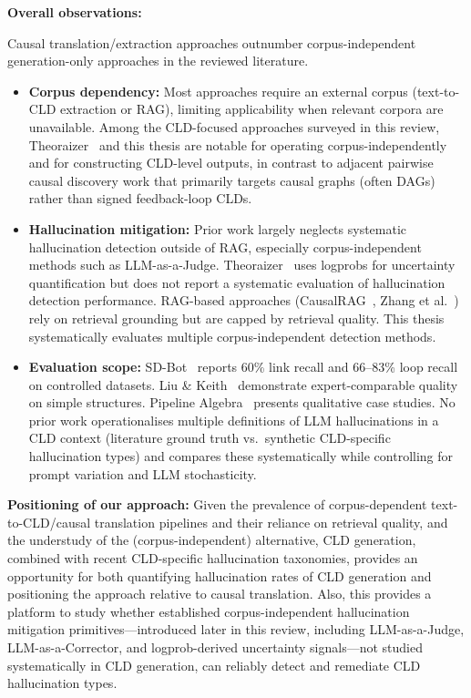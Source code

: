 \noindent\textbf{Overall observations:}

\noindent Causal translation/extraction approaches outnumber corpus-independent generation-only approaches in the reviewed literature.

\begin{itemize}[noitemsep]
    \item \textbf{Corpus dependency:} Most approaches require an external corpus (text-to-CLD extraction or RAG), limiting applicability when relevant corpora are unavailable. Among the CLD-focused approaches surveyed in this review, Theoraizer~\citep{Waaijers2024theoraizer} and this thesis are notable for operating corpus-independently and for constructing CLD-level outputs, in contrast to adjacent pairwise causal discovery work that primarily targets causal graphs (often DAGs) rather than signed feedback-loop CLDs.
    \item \textbf{Hallucination mitigation:} Prior work largely neglects systematic hallucination detection outside of RAG, especially corpus-independent methods such as LLM-as-a-Judge. Theoraizer~\citep{Waaijers2024theoraizer} uses logprobs for uncertainty quantification but does not report a systematic evaluation of hallucination detection performance. RAG-based approaches (CausalRAG~\citep{wang2025causalrag}, Zhang et al.~\citep{zhang2024causal}) rely on retrieval grounding but are capped by retrieval quality. This thesis systematically evaluates multiple corpus-independent detection methods.
    \item \textbf{Evaluation scope:} SD-Bot~\citep{hosseinichimeh2024textmapdynamicsbot} reports 60\% link recall and 66--83\% loop recall on controlled datasets. Liu \& Keith~\citep{liu2025leveraging} demonstrate expert-comparable quality on simple structures. Pipeline Algebra~\citep{reinholtz2025pipelinealgebra} presents qualitative case studies. No prior work operationalises multiple definitions of LLM hallucinations in a CLD context (literature ground truth vs.\ synthetic CLD-specific hallucination types) and compares these systematically while controlling for prompt variation and LLM stochasticity.
\end{itemize}

\noindent\textbf{Positioning of our approach:} Given the prevalence of corpus-dependent text-to-CLD/causal translation pipelines and their reliance on retrieval quality, and the understudy of the (corpus-independent) alternative, CLD generation, combined with recent CLD-specific hallucination taxonomies, provides an opportunity for both quantifying hallucination rates of CLD generation and positioning the approach relative to causal translation. Also, this provides a platform to study whether established corpus-independent hallucination mitigation primitives---introduced later in this review, including LLM-as-a-Judge, LLM-as-a-Corrector, and logprob-derived uncertainty signals---not studied systematically in CLD generation, can reliably detect and remediate CLD hallucination types.

